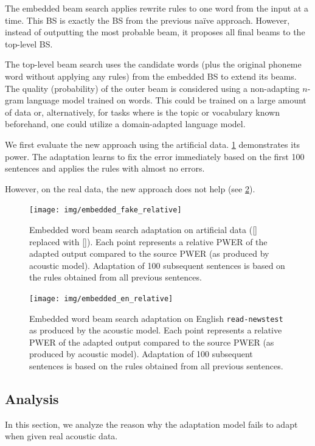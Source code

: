 The embedded beam search applies rewrite rules to one word from the input at a time. This BS is exactly the BS from the previous na\"ive approach. However, instead of outputting the most probable beam, it proposes all final beams to the top-level BS.

The top-level beam search uses the candidate words (plus the original phoneme word without applying any rules) from the embedded BS to extend its beams. The quality (probability) of the outer beam is considered using a non-adapting $n$-gram language model trained on words. This could be trained on a large amount of data or, alternatively, for tasks where is the topic or vocabulary known beforehand, one could utilize a domain-adapted language model. 

We first evaluate the new approach using the artificial data. \cref{fig:embedded} demonstrates its power. The adaptation learns to fix the error immediately based on the first 100 sentences and applies the rules with almost no errors.

However, on the real data, the new approach does not help (see \cref{fig:embedded_en}). 

\begin{figure}[h]
    \texttt{[image: img/embedded\_fake\_relative]}
    \caption[Embedded word beam search  adaptation on artificial data]{Embedded word beam search  adaptation on artificial data ([] replaced with []). Each point represents a relative PWER of the adapted output compared to the source PWER (as produced by acoustic model). Adaptation of 100 subsequent sentences is based on the rules obtained from all previous sentences.}
    \label{fig:embedded} 
\end{figure}

\begin{figure}[h]
    \texttt{[image: img/embedded\_en\_relative]}
    \caption[Embedded word beam search adaptation on English]{Embedded word beam search adaptation on English \texttt{read-newstest} as produced by the acoustic model. Each point represents a relative PWER of the adapted output compared to the source PWER (as produced by acoustic model). Adaptation of 100 subsequent sentences is based on the rules obtained from all previous sentences.}
    \label{fig:embedded_en} 
\end{figure}


\subsection{Analysis}
In this section, we analyze the reason why the adaptation model fails to adapt when given real acoustic data.

